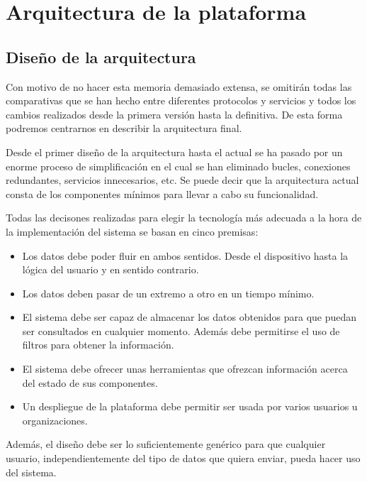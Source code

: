 \chapter{Arquitectura de la plataforma}
\pagestyle{esitscCD}

\section{Diseño de la arquitectura}

Con motivo de no hacer esta
memoria demasiado extensa, se omitirán todas las comparativas que se han hecho
entre diferentes protocolos y servicios y todos los cambios realizados desde la
primera versión hasta la definitiva. De esta forma podremos centrarnos en
describir la arquitectura final.

Desde el primer diseño de la arquitectura hasta el actual se ha pasado por un
enorme proceso de simplificación en el cual se han eliminado bucles, conexiones
redundantes, servicios innecesarios, etc. Se puede decir que la arquitectura
actual consta de los componentes mínimos para llevar a cabo su funcionalidad.

Todas las decisones realizadas para elegir la tecnología más adecuada a la hora
de la implementación del sistema se basan en cinco premisas:

\begin{itemize}\itemsep1pt \parskip0pt 
\item {} Los datos debe poder fluir en ambos sentidos. Desde el
dispositivo hasta la lógica del usuario y en sentido contrario.
\item {} Los datos deben pasar de un extremo a otro en un tiempo mínimo.
\item {} El sistema debe ser capaz de almacenar los datos obtenidos para
que puedan ser consultados en cualquier momento. Además debe permitirse el uso
de filtros para obtener la información.
\item {} El sistema debe ofrecer unas herramientas que ofrezcan
información acerca del estado de sus componentes.
\item {} Un despliegue de la plataforma debe permitir ser usada por
varios usuarios u organizaciones.
\end{itemize}

Además, el diseño debe ser lo suficientemente genérico para que cualquier
usuario, independientemente del tipo de datos que quiera enviar, pueda hacer uso
del sistema.

